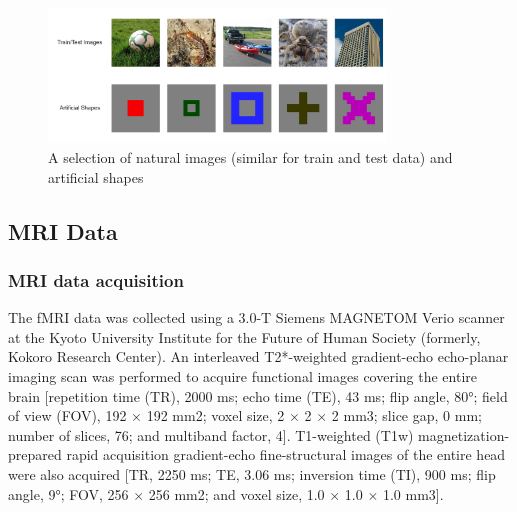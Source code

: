 \begin{figure}[ht]
    \centering
    \includegraphics[width=0.8\textwidth]{plots/datasets_train_art_images.jpeg}
    \caption{A selection of natural images (similar for train and test data) and artificial shapes}\label{fig:datasets_train_art}
\end{figure}

\subsection{MRI Data}
\subsubsection{MRI data acquisition}
The fMRI data was collected using a 3.0-T Siemens MAGNETOM Verio scanner at the Kyoto University Institute for the Future of Human Society (formerly, Kokoro Research Center). An interleaved T2*-weighted gradient-echo echo-planar imaging scan was performed to acquire functional images covering the entire brain [repetition time (TR), 2000 ms; echo time (TE), 43 ms; flip angle, 80°; field of view (FOV), 192 $\times$ 192 mm2; voxel size, 2 $\times$ 2 $\times$ 2 mm3; slice gap, 0 mm; number of slices, 76; and multiband factor, 4]. T1-weighted (T1w) magnetization-prepared rapid acquisition gradient-echo fine-structural images of the entire head were also acquired [TR, 2250 ms; TE, 3.06 ms; inversion time (TI), 900 ms; flip angle, 9°; FOV, 256 $\times$ 256 mm2; and voxel size, 1.0 $\times$ 1.0 $\times$ 1.0 mm3].

